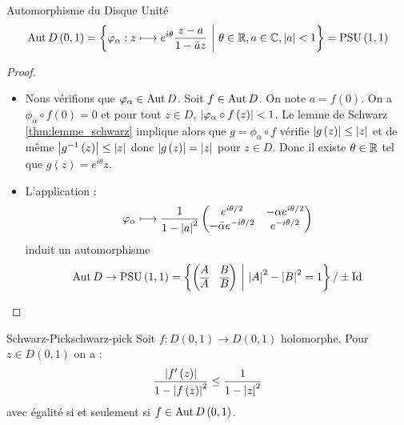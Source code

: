 \documentclass{cours}
\begin{document}
\begin{théorème}{Automorphisme du Disque Unité}{}
    \begin{equation*}
        \operatorname{Aut} D\left(0, 1\right) = \left\{\varphi_{\alpha} : z \longmapsto e^{i\theta}\frac{z - a}{1 - \bar{a}z}\ \middle|\ \theta \in \mathbb{R}, a \in \mathbb{C}, \left|a\right| < 1\right\} = {\rm PSU}\left(1, 1\right)
    \end{equation*}
\end{théorème}
\begin{proof}
    \begin{itemize}
        \item Nous vérifions que $\varphi_{\alpha} \in \operatorname{Aut} D$. Soit $f \in \operatorname{Aut} D$. On note $a = f\left(0\right)$. On a $\phi_{\alpha} \circ f\left(0\right) = 0$ et pour tout $z \in D$, $\left|\varphi_{\alpha} \circ f\left(z\right)\right| < 1$. Le lemme de Schwarz \ref{thm:lemme_schwarz} implique alors que $g = \phi_{\alpha} \circ f$ vérifie $\left|g\left(z\right)\right| \leq \left|z\right|$ et de même $\left|g^{-1}\left(z\right)\right| \leq \left|z\right|$ donc $\left|g\left(z\right)\right| = \left|z\right|$ pour $z\in D$. Donc il existe $\theta \in \mathbb{R}$ tel que $g\left(z\right) = e^{i\theta}z$.
        \item L'application : 
        \begin{equation*}
            \varphi_{\alpha}\longmapsto \frac{1}{1- \left|a\right|^{2}}\begin{pmatrix}
                e^{i\theta/2} & -\alpha e^{i\theta/2} \\
                -\bar{\alpha}e^{-i\theta/2} & e^{-i\theta/2}
            \end{pmatrix}
        \end{equation*}
        induit un automorphisme 
        \begin{equation*}
            \operatorname{Aut} D \rightarrow {\rm PSU}\left(1, 1\right) = \left\{\begin{pmatrix}
                A & B \\ \overline{A} & \overline{B}
            \end{pmatrix}\ \middle| \ \left|A\right|^{2} - \left|B\right|^{2} = 1\right\}/\pm {\rm Id}
        \end{equation*}
    \end{itemize}
\end{proof}
\begin{corollaire}{Schwarz-Pick}{schwarz-pick}
    Soit $f : D\left(0, 1\right) \to D\left(0, 1\right)$ holomorphe. Pour $z \in D\left(0, 1\right)$ on a :
    \begin{equation*}
        \frac{\left|f'\left(z\right)\right|}{1 - \left|f\left(z\right)\right|^{2}} \leq \frac{1}{1 - \left|z\right|^{2}}
    \end{equation*}
    avec égalité si et seulement si $f \in \operatorname{Aut} D\left(0, 1\right)$.
\end{corollaire}
\end{document}
